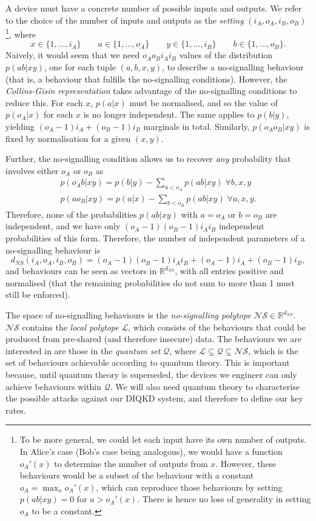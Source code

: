 \documentclass[10pt, a4paper]{article}
\newcommand{\?}{\mathrel{?}} %
\newcommand{\R}{\mathbb{R}} %
\numberwithin{equation}{section} %
\theoremstyle{definition}
\theoremstyle{plain}
\theoremstyle{plain}
\newcommand{\Ls}{\mathcal{L}}
\newcommand{\Qs}{\mathcal{Q}}
\newcommand{\NSs}{\mathcal{NS}}
\begin{document}
  A device must have a concrete number of possible inputs and outputs. We refer to the choice of the number of inputs and outputs as the \emph{setting} \((i_A, o_A, i_B, o_B)\)\footnote{To be more general, we could let each input have its own number of outputs. In Alice's case (Bob's case being analogous), we would have a function \(o_A'(x)\) to determine the number of outputs from \(x\). However, these behaviours would be a subset of the behaviour with a constant \(o_A = \max_x o_A'(x)\), which can reproduce those behaviours by setting \(p(ab|xy) = 0\) for \(a > o_A'(x)\). There is hence no loss of generality in setting \(o_A\) to be a constant.}, where
  \[ x \in \{1, \ldots, i_A\} \qquad a \in \{1, \ldots, o_A\} \qquad y \in \{1, \ldots, i_B\} \qquad b \in \{1, \ldots, o_B\}. \]
  Naively, it would seem that we need \(o_A o_B i_A i_B\) values of the distribution \(p(ab|xy)\), one for each tuple \((a, b, x, y)\), to describe a no-signalling behaviour (that is, a behaviour that fulfills the no-signalling conditions). However, the \emph{Collins-Gisin representation} takes advantage of the no-signalling conditions to reduce this. For each \(x\), \(p(a|x)\) must be normalised, and so the value of \(p(o_A|x)\) for each \(x\) is no longer independent. The same applies to \(p(b|y)\), yielding \((o_A-1)i_A + (o_B-1)i_B\) marginals in total. Similarly, \(p(o_A o_B|xy)\) is fixed by normalisation for a given \((x,y)\).

  Further, the no-signalling condition allows us to recover \emph{any} probability that involves either \(o_A\) or \(o_B\) as
  \begin{gather*}
    p(o_A b|xy) = p(b|y) - \sum_{a < o_A} p(ab|xy)\;\forall b,x,y \\
    p(ao_B|xy) = p(a|x) - \sum_{b < o_B} p(ab|xy)\;\forall a,x,y.
  \end{gather*}
  Therefore, none of the probabilities \(p(ab|xy)\) with \(a = o_A\) or \(b = o_B\) are independent, and we have only \((o_A-1)(o_B-1){i_A}{i_B}\) independent probabilities of this form. Therefore, the number of independent parameters of a no-signalling behaviour is
  \[ d_{NS}(i_A, o_A, i_B, o_B) = (o_A-1)(o_B-1){i_A}{i_B} + (o_A-1)i_A + (o_B-1)i_B, \]
  and behaviours can be seen as vectors in \(\R^{d_{NS}}\), with all entries positive and normalised (that the remaining probabilities do not sum to more than 1 must still be enforced).

  The space of no-signalling behaviours is the \emph{no-signalling polytope} \(\NSs \in \R^{d_{NS}}\). \(\NSs\) contains the \emph{local polytope} \(\Ls\), which consists of the behaviours that could be produced from pre-shared (and therefore insecure) data. The behaviours we are interested in are those in the \emph{quantum set} \(\Qs\), where \(\Ls \subsetneq \Qs \subsetneq \NSs\), which is the set of behaviours achievable according to quantum theory. This is important because, until quantum theory is superseded, the devices we engineer can only achieve behaviours within \(\Qs\). We will also need quantum theory to characterise the possible attacks against our DIQKD system, and therefore to define our key rates.
\end{document}
